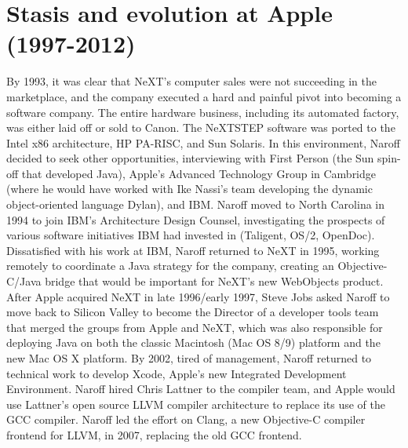 \documentclass[acmsmall]{acmart}\settopmatter{}
\begin{document}
\section{Stasis and evolution at Apple (1997-2012)}
\label{sec-apple1997-2012}
By 1993, it was clear that NeXT's computer sales were not succeeding in the marketplace, and the company executed a hard and painful pivot into becoming a software company. The entire hardware business, including its automated factory, was either laid off or sold to Canon. The NeXTSTEP software was ported to the Intel x86 architecture, HP PA-RISC, and Sun Solaris. In this environment, Naroff decided to seek other opportunities, interviewing with First Person (the Sun spin-off that developed Java), Apple's Advanced Technology Group in Cambridge (where he would have worked with Ike Nassi's team developing the dynamic object-oriented language Dylan), and IBM. Naroff moved to North Carolina in 1994 to join IBM's Architecture Design Counsel, investigating the prospects of various software initiatives IBM had invested in (Taligent, OS/2, OpenDoc). Dissatisfied with his work at IBM, Naroff returned to NeXT in 1995, working remotely to coordinate a Java strategy for the company, creating an Objective-C/Java bridge that would be important for NeXT's new WebObjects product. After Apple acquired NeXT in late 1996/early 1997, Steve Jobs asked Naroff to move back to Silicon Valley to become the Director of a developer tools team that merged the groups from Apple and NeXT, which was also responsible for deploying Java on both the classic Macintosh (Mac OS 8/9) platform and the new Mac OS X platform. By 2002, tired of management, Naroff returned to technical work to develop Xcode, Apple's new Integrated Development Environment. Naroff hired Chris Lattner to the compiler team, and Apple would use Lattner's open source LLVM compiler architecture to replace its use of the GCC compiler. Naroff led the effort on Clang, a new Objective-C compiler frontend for LLVM, in 2007, replacing the old GCC frontend.
\end{document}
